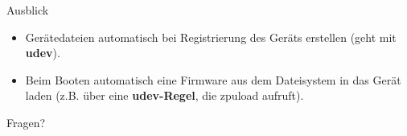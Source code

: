 \documentclass[10pt]{beamer}
\begin{document}
	\begin{frame}{Ausblick}
		\begin{itemize}
			\item Gerätedateien automatisch bei Registrierung des Geräts erstellen (geht mit \textbf{udev}).
			\item Beim Booten automatisch eine Firmware aus dem Dateisystem in das Gerät laden (z.B. über eine \textbf{udev-Regel}, die zpuload aufruft).
		\end{itemize}
		\vspace{1cm}
		\begin{center}
			\huge Fragen?
		\end{center}
	\end{frame}
\end{document}
